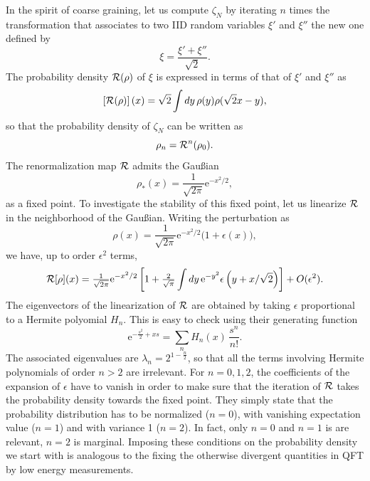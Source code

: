 \documentclass[10pt,here,feynmf]{article}
\begin{document}
In the spirit of coarse graining, let us compute $\zeta_{N}$ by iterating $n$ times the transformation that associates to two IID random variables $\xi'$ and $\xi''$ the new one defined by  
\begin{equation}
\xi=\frac{\xi'+\xi''}{\sqrt{2}}.
\end{equation}
The probability density ${\cal R}(\rho)$ of $\xi$ is expressed in terms of that of $\xi'$ and $\xi''$ as
\begin{equation}
\left[{\cal R}(\rho)\right](x)=\sqrt{2}\int dy\, \rho(y)\rho(\sqrt{2}x-y),
\end{equation}
so that the probability density of $\zeta_{N}$ can be written as
\begin{equation} 
\rho_{n}={\cal R}^{n}(\rho_{0}).
\end{equation}
The renormalization map ${\cal R}$ admits the Gau\ss ian
\begin{equation}
\rho_{*}(x)=\textstyle{\frac{1}{\sqrt{2\pi}}}\mathrm{e}^{-x^{2}/2},
\end{equation}
as a fixed point. To investigate the stability of this fixed point, let us linearize ${\cal R}$ in the neighborhood of the Gau\ss ian. Writing the perturbation as
\begin{equation}
\rho(x)=\textstyle{\frac{1}{\sqrt{2\pi}}}\mathrm{e}^{-x^{2}/2}
\Big(1+\epsilon(x)\Big),
\end{equation}
we have, up to order $\epsilon^{2}$ terms, 
\begin{equation}
{\cal R}[\rho](x)={\textstyle\frac{1}{\sqrt{2\pi}}}\mathrm{e}^{-x^{2}/2}\left[1+{\textstyle\frac{2}{\sqrt{\pi}}}
\int dy \,\mathrm{e}^{-y^{2}}\epsilon\left(y+x/\sqrt{2}\right)
\right]
+O(\epsilon^{2}).
\end{equation}
The eigenvectors of the linearization  of ${\cal R}$ are obtained by taking $\epsilon$ proportional to a Hermite polyomial $H_{n}$. This is easy to check using their generating function
\begin{equation}
\mathrm{e}^{-\frac{s^{2}}{2}+xs}=\sum_{n}H_{n}(x)\,\frac{s^{n}}{n!}.
\end{equation}
The associated eigenvalues are $\lambda_{n}=2^{1-\frac{n}{2}}$, so that all the terms involving Hermite polynomials of order $n>2$ are irrelevant. For $n=0,1,2$, the coefficients of the expansion of $\epsilon$  have to vanish in order to make sure that the iteration of ${\cal R}$ takes the probability density towards the fixed point. They simply state that the probability distribution has to be normalized ($n=0$), with vanishing expectation value ($n=1$) and with variance  1 ($n=2$). In fact, only $n=0$ and $n=1$ is are relevant, $n=2$ is marginal. Imposing these conditions on the probability density we start with is analogous to the fixing the otherwise divergent quantities in QFT by low energy measurements. 
\end{document}
